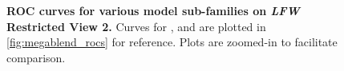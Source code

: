 \begin{figure}[ht]
\centering
{}

\caption[]{{\bf ROC curves for various model sub-families on \emph{LFW}
    Restricted View 2.} Curves for \cite{wolf:accv09}, \cite{kumar:iccv09} and \cite{cao2010face}
  are plotted in \ref{fig:megablend_rocs} for reference.  Plots are zoomed-in to
  facilitate comparison.}
\label{fig:roc_curves}
\end{figure}


